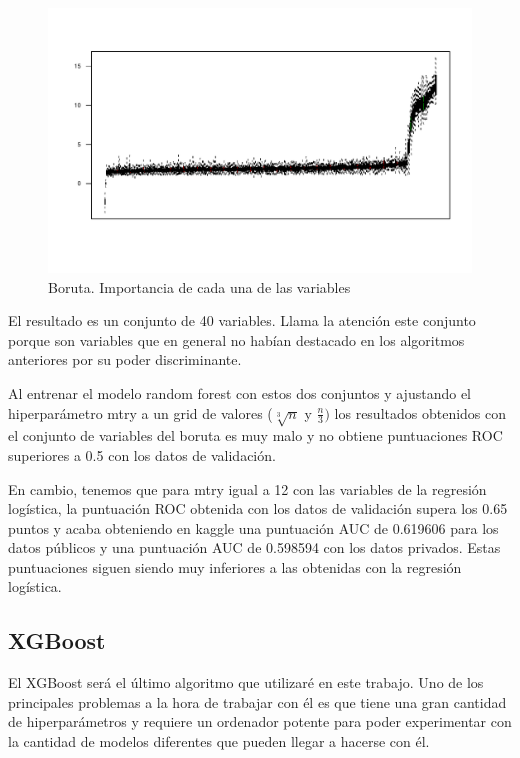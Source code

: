 \documentclass[11pt,a4paper,spanish]{article} %
\begin{document}
\begin{figure}[h!]
	\begin{center}
	\includegraphics[width=\textwidth]{Z_05_01_importancia_variables_boruta.pdf}
    \caption{Boruta. Importancia de cada una de las variables}
    \end{center}
\end{figure}

El resultado es un conjunto de 40 variables. Llama la atención este conjunto porque son variables que en general no habían destacado en los algoritmos anteriores por su poder discriminante.

Al entrenar el modelo random forest con estos dos conjuntos y ajustando el hiperparámetro mtry a un grid de valores ($\sqrt[3]{n}$ y $\frac{n}{3})$ los resultados obtenidos con el conjunto de variables del boruta es muy malo y no obtiene puntuaciones ROC superiores a 0.5 con los datos de validación. 

En cambio, tenemos que para mtry igual a 12 con las variables de la regresión logística, la puntuación ROC obtenida con los datos de validación supera los 0.65 puntos y acaba obteniendo en kaggle una puntuación AUC de 0.619606 para los datos públicos y una puntuación AUC de 0.598594 con los datos privados. Estas puntuaciones siguen siendo muy inferiores a las obtenidas con la regresión logística.  

\vspace{1cm}
\subsection{XGBoost}
El XGBoost será el último algoritmo que utilizaré en este trabajo. Uno de los principales problemas a la hora de trabajar con él es que tiene una gran cantidad de hiperparámetros y requiere un ordenador potente para poder experimentar con la cantidad de modelos diferentes que pueden llegar a hacerse con él. 
\end{document}
